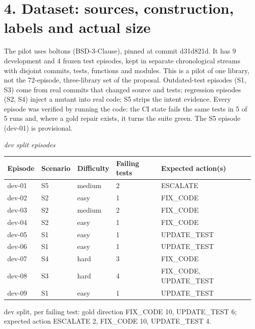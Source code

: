\documentclass[10pt,a4paper]{article}
\begin{document}
\section*{4. Dataset: sources, construction, labels and actual size}
The pilot uses boltons (BSD-3-Clause), pinned at commit d31d821d. It has 9 development and 4 frozen test episodes, kept in separate chronological streams with disjoint commits, tests, functions and modules. This is a pilot of one library, not the 72-episode, three-library set of the proposal. Outdated-test episodes (S1, S3) come from real commits that changed source and tests; regression episodes (S2, S4) inject a mutant into real code; S5 strips the intent evidence. Every episode was verified by running the code: the CI state fails the same tests in 5 of 5 runs and, where a gold repair exists, it turns the suite green. The S5 episode (dev-01) is provisional.

{\small\itshape dev split episodes}\par\nopagebreak
\begin{longtable}{|>{\raggedright\arraybackslash\footnotesize}p{}>{\raggedright\arraybackslash\footnotesize}p{}>{\raggedright\arraybackslash\footnotesize}p{}>{\raggedright\arraybackslash\footnotesize}p{}>{\raggedright\arraybackslash\footnotesize}p{}|}
\hline
\textbf{Episode} & \textbf{Scenario} & \textbf{Difficulty} & \textbf{Failing tests} & \textbf{Expected action(s)} \\ \hline\endhead
dev-01 & S5 & medium & 2 & ESCALATE \\ \hline
dev-02 & S2 & easy & 1 & FIX\_CODE \\ \hline
dev-03 & S2 & medium & 2 & FIX\_CODE \\ \hline
dev-04 & S2 & easy & 1 & FIX\_CODE \\ \hline
dev-05 & S1 & easy & 1 & UPDATE\_TEST \\ \hline
dev-06 & S1 & easy & 1 & UPDATE\_TEST \\ \hline
dev-07 & S4 & hard & 3 & FIX\_CODE \\ \hline
dev-08 & S3 & hard & 4 & FIX\_CODE, UPDATE\_TEST \\ \hline
dev-09 & S1 & easy & 1 & UPDATE\_TEST \\ \hline
\end{longtable}
dev split, per failing test: gold direction FIX\_CODE 10, UPDATE\_TEST 6; expected action ESCALATE 2, FIX\_CODE 10, UPDATE\_TEST 4.
\end{document}
